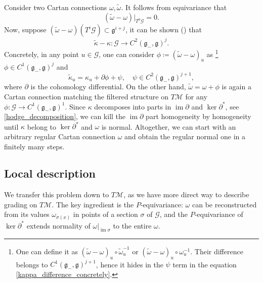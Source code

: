 \documentclass{amsart}
\theoremstyle{plain}
\theoremstyle{definition}
\theoremstyle{remark}
\newcommand{\mc}[1]{\mathcal{#1}}
\newcommand{\mfk}[1]{\mathfrak{#1}}
\newcommand{\on}[1]{\operatorname{#1}}
\begin{document}
Consider two Cartan connections $\omega, \widetilde{\omega}$. It follows from equivariance that
\begin{equation*} %
    \left(\widetilde\omega - \omega \right) \big|_{T^0\mc{G}} = 0.
\end{equation*}
Now, suppose $(\widetilde\omega - \omega) \left(T^i \mc{G}\right) \subset \mfk{g}^{i+j}$, it can be shown (\cite[p.]{parabook}) that 
\begin{equation} \label{kappa_difference}
    \widetilde\kappa - \kappa \colon \mc{G} \to C^2(\mfk{g}_-, \mfk{g})^j.
\end{equation}
Concretely, in any point $u \in \mc{G}$, one can consider $\phi \coloneqq (\widetilde\omega - \omega)_u$ as%
\footnote{One can define it as $(\widetilde\omega - \omega)_u \circ \widetilde\omega_u^{-1}$ or $(\widetilde\omega - \omega)_u \circ \omega_u^{-1}$. Their difference belongs to $C^1(\mfk{g}_-,\mfk{g})^{j+1}$, hence it hides in the $\psi$ term in the equation \eqref{kappa_difference_concretely}.}
$\phi \in C^1(\mfk{g}_-, \mfk{g})^j$ and
\begin{equation} \label{kappa_difference_concretely}
    \widetilde\kappa_u = \kappa_u + \partial \phi + \psi, \quad \psi \in C^2(\mfk{g}_-, \mfk{g})^{j+1},
\end{equation}
where $\partial$ is the cohomology differential. On the other hand, $\widetilde\omega = \omega + \phi$ is again a Cartan connection matching the filtered structure on $T\mc{M}$ for any $\phi\colon \mc{G} \to C^1(\mfk{g}_-,\mfk{g})^1$. Since $\kappa$ decomposes into parts in $\on{im} \partial$ and $\ker \partial^*$, see \eqref{hodge_decomposition}, we can kill the $\on{im} \partial$ part homogeneity by homogeneity until $\kappa$ belong to $\ker \partial^*$ and $\omega$ is normal.
Altogether, we can start with an arbitrary regular Cartan connection $\omega$ and obtain the regular normal one in a finitely many steps.


\subsection{Local description} \label{section:local_describtion}
%
We transfer this problem down to $T\mc{M}$, as we have more direct way to describe grading on $T\mc{M}$. The key ingredient is the $P$-equivariance: $\omega$ can be reconstructed from its values $\omega_{\sigma(x)}$ in points of a section $\sigma$ of $\mc{G}$, and the $P$-equivariance of $\ker \partial^*$ extends normality of $\omega\big|_{\on{im} \sigma}$ to the entire $\omega$.
\end{document}
